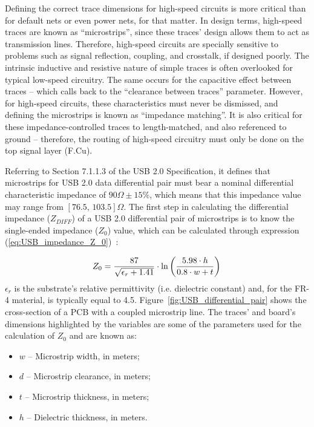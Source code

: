 Defining the correct trace dimensions for high-speed circuits is more critical than for default nets or even power nets, for that matter. In design terms, high-speed traces are known as ``microstrips'', since these traces' design allows them to act as transmission lines. Therefore, high-speed circuits are specially sensitive to problems such as signal reflection, coupling, and crosstalk, if designed poorly. The intrinsic inductive and resistive nature of simple traces is often overlooked for typical low-speed circuitry. The same occurs for the capacitive effect between traces -- which calls back to the ``clearance between traces'' parameter. However, for high-speed circuits, these characteristics must never be dismissed, and defining the microstrips is known as ``impedance matching''. It is also critical for these impedance-controlled traces to length-matched, and also referenced to ground -- therefore, the routing of high-speed circuitry must only be done on the top signal layer (F.Cu).

Referring to Section 7.1.1.3 of the USB 2.0 Specification, it defines that microstrips for USB 2.0 data differential pair must bear a nominal differential characteristic impedance of $90 \Omega \pm 15\%$, which means that this impedance value may range from $[76.5,\, 103.5]\Omega$.
The first step in calculating the differential impedance ($Z_{DIFF}$) of a USB 2.0 differential pair of microstrips is to know the single-ended impedance ($Z_0$) value, which can be calculated through expression (\ref{eq:USB_impedance_Z_0})~\cite{USB_Routing}:

\begin{equation}\label{eq:USB_impedance_Z_0}
	Z_0 = \frac{87}{\sqrt{\epsilon_r + 1.41}} \cdot \ln \left(\frac{5.98 \cdot h}{0.8 \cdot w + t}\right)\,\medskip
\end{equation}
$\epsilon_r$ is the substrate's relative permittivity (i.e. dielectric constant) and, for the FR-4 material, is typically equal to 4.5.
Figure~\ref{fig:USB_differential_pair} shows the cross-section of a PCB with a coupled microstrip line. The traces' and board's dimensions highlighted by the variables are some of the parameters used for the calculation of $Z_0$ and are known as:
\begin{itemize}
	\item $w$ -- Microstrip width, in meters;
	
	\item $d$ -- Microstrip clearance, in meters;
	
	\item $t$ -- Microstrip thickness, in meters;
	
	\item $h$ -- Dielectric thickness, in meters.
\end{itemize}

